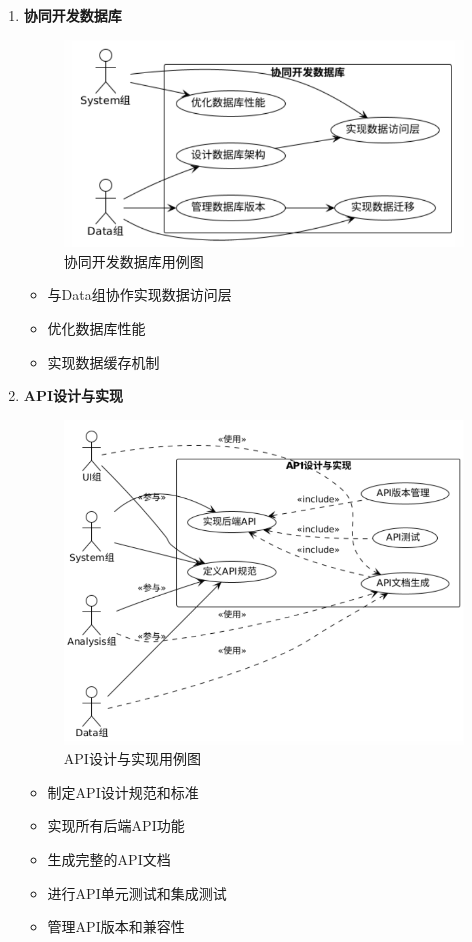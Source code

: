 \documentclass[a4paper,12pt]{article}
\begin{document}
\begin{enumerate}
  \item \textbf{协同开发数据库}
  
  \begin{figure}[H]
    \centering
    \includegraphics[width=0.75\linewidth]{assets/image8.png}
    \caption{协同开发数据库用例图}
    \label{fig:database-development}
  \end{figure}
  
  \begin{itemize}
    \item 与Data组协作实现数据访问层
    \item 优化数据库性能
    \item 实现数据缓存机制
  \end{itemize}
  
  \item \textbf{API设计与实现}
  
  \begin{figure}[H]
    \centering
    \includegraphics[width=0.75\linewidth]{assets/image4.png}
    \caption{API设计与实现用例图}
    \label{fig:api-design}
  \end{figure}
  
  \begin{itemize}
    \item 制定API设计规范和标准
    \item 实现所有后端API功能
    \item 生成完整的API文档
    \item 进行API单元测试和集成测试
    \item 管理API版本和兼容性
  \end{itemize}
  

\end{enumerate}
\end{document}
